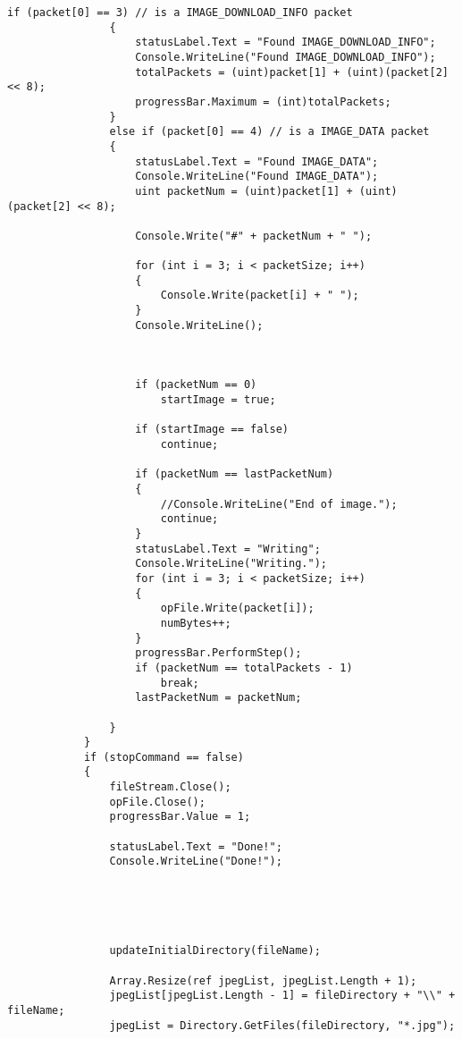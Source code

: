 \begin{lstlisting}[caption=Main Form of GUI, label=appen:main_form]
                if (packet[0] == 3) // is a IMAGE_DOWNLOAD_INFO packet 
                {
                    statusLabel.Text = "Found IMAGE_DOWNLOAD_INFO";
                    Console.WriteLine("Found IMAGE_DOWNLOAD_INFO");
                    totalPackets = (uint)packet[1] + (uint)(packet[2] << 8);
                    progressBar.Maximum = (int)totalPackets;
                }
                else if (packet[0] == 4) // is a IMAGE_DATA packet
                {
                    statusLabel.Text = "Found IMAGE_DATA";
                    Console.WriteLine("Found IMAGE_DATA");
                    uint packetNum = (uint)packet[1] + (uint)(packet[2] << 8);

                    Console.Write("#" + packetNum + " ");

                    for (int i = 3; i < packetSize; i++)
                    {
                        Console.Write(packet[i] + " ");
                    }
                    Console.WriteLine();



                    if (packetNum == 0)
                        startImage = true;

                    if (startImage == false)
                        continue;

                    if (packetNum == lastPacketNum)
                    {
                        //Console.WriteLine("End of image.");
                        continue;
                    }
                    statusLabel.Text = "Writing";
                    Console.WriteLine("Writing.");
                    for (int i = 3; i < packetSize; i++)
                    {
                        opFile.Write(packet[i]);
                        numBytes++;
                    }
                    progressBar.PerformStep();
                    if (packetNum == totalPackets - 1)
                        break;
                    lastPacketNum = packetNum;

                }
            }
            if (stopCommand == false)
            {
                fileStream.Close();
                opFile.Close();
                progressBar.Value = 1;

                statusLabel.Text = "Done!";
                Console.WriteLine("Done!");


                


                updateInitialDirectory(fileName);

                Array.Resize(ref jpegList, jpegList.Length + 1);
                jpegList[jpegList.Length - 1] = fileDirectory + "\\" + fileName;
                jpegList = Directory.GetFiles(fileDirectory, "*.jpg");



\end{lstlisting}
